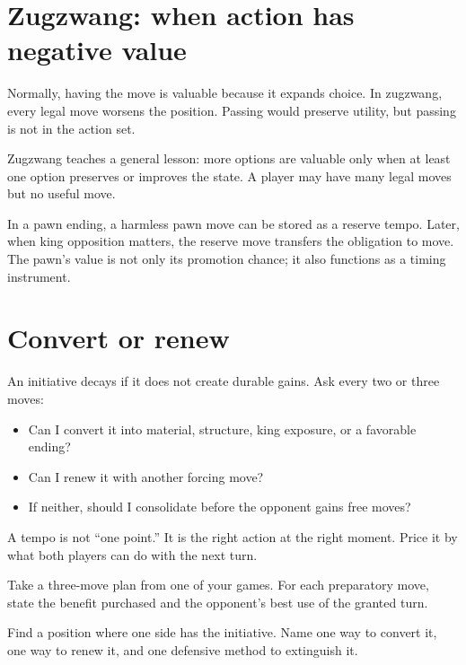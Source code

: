 \section{Zugzwang: when action has negative value}
Normally, having the move is valuable because it expands choice. In zugzwang, every legal move worsens the position. Passing would preserve utility, but passing is not in the action set.

Zugzwang teaches a general lesson: more options are valuable only when at least one option preserves or improves the state. A player may have many legal moves but no useful move.

\begin{workedbox}[title={Worked example: reserve tempi}]
In a pawn ending, a harmless pawn move can be stored as a reserve tempo. Later, when king opposition matters, the reserve move transfers the obligation to move. The pawn's value is not only its promotion chance; it also functions as a timing instrument.
\end{workedbox}

\section{Convert or renew}
An initiative decays if it does not create durable gains. Ask every two or three moves:

\begin{itemize}[leftmargin=1.4em]
\item Can I convert it into material, structure, king exposure, or a favorable ending?
\item Can I renew it with another forcing move?
\item If neither, should I consolidate before the opponent gains free moves?
\end{itemize}

\begin{memorybox}
A tempo is not ``one point.'' It is the right action at the right moment. Price it by what both players can do with the next turn.
\end{memorybox}

\begin{exercise}
Take a three-move plan from one of your games. For each preparatory move, state the benefit purchased and the opponent's best use of the granted turn.
\end{exercise}

\begin{exercise}
Find a position where one side has the initiative. Name one way to convert it, one way to renew it, and one defensive method to extinguish it.
\end{exercise}

